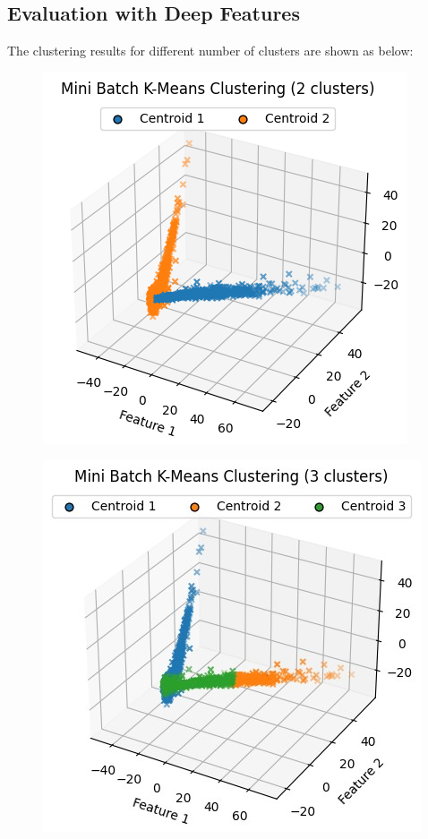 \documentclass{template}
\begin{document}
\subsection{Evaluation with Deep Features}
The clustering results for different number of clusters are shown as below:
\begin{figure}
\includegraphics[scale=0.7]{Clustering1.png}
\caption{}
\label{fig:logo}
\end{figure}
\begin{figure}
\includegraphics[scale=0.7]{Clustering2.png.jpg}
\caption{}
\label{fig:logo}
\end{figure}
\end{document}
